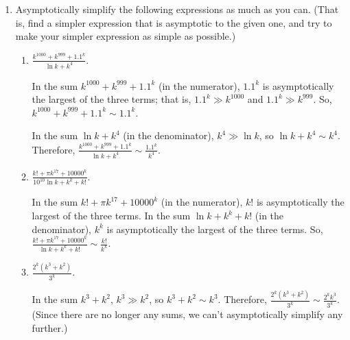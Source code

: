 \documentclass[main]{subfiles}
\begin{document}
\begin{enumerate}[resume]
\item  Asymptotically simplify the following expressions as much as you
can.  (That is, find a simpler expression that is asymptotic to the
given one, and try to make your simpler expression as simple as
possible.)
\begin{enumerate}
  \item
  \begin{problem}[\vfill]
  $\displaystyle \frac{k^{1000} + k^{999} + 1.1^k}{\ln k + k^4}$.  
  \end{problem}

  \begin{solution}
  In the sum $k^{1000} + k^{999} + 1.1^k$ (in the numerator), $1.1^k$
  is asymptotically the largest of the three terms; that is, $1.1^k
  \gg k^{1000}$ and $1.1^k \gg k^{999}$.  So, $k^{1000} + k^{999} +
  1.1^k \sim 1.1^k$.

  In the sum $\ln k + k^4$ (in the denominator), $k^4 \gg \ln k$, so
  $\ln k + k^4 \sim k^4$.  Therefore, $\displaystyle \frac{k^{1000} +
  k^{999} + 1.1^k}{\ln k + k^4} \sim \boxed{\frac{1.1^k}{k^4}}$.
  \end{solution}

  \item
  \begin{problem}[\vfill]
  $\displaystyle \frac{k! + \pi k^{17} + 10000^k}{10^{10} \ln k + k^k 
  + k!}$.
  \end{problem}

  \begin{solution}
  In the sum $k! + \pi k^{17} + 10000^k$ (in the numerator), $k!$ is
  asymptotically the largest of the three terms.  In the sum $\ln k +
  k^k + k!$ (in the denominator), $k^k$ is asymptotically the largest
  of the three terms.  So, $\displaystyle \frac{k! + \pi k^{17} +
  10000^k}{\ln k + k^k + k!} \sim \frac{k!}{k^k}$. 
  \end{solution}

  \item
  \begin{problem}[\vfill]
  $\displaystyle \frac{2^k (k^3 + k^2)}{3^k}$.
  \end{problem}

  \begin{solution}
  In the sum $k^3 + k^2$, $k^3 \gg k^2$, so $k^3 + k^2 \sim k^3$.
  Therefore, $\displaystyle \frac{2^k (k^3 + k^2)}{3^k} \sim
  \boxed{\frac{2^k k^3}{3^k}}$.  (Since there are no longer any sums,
  we can't asymptotically simplify any further.)
  \end{solution}


\end{enumerate}
\end{enumerate}
\end{document}
